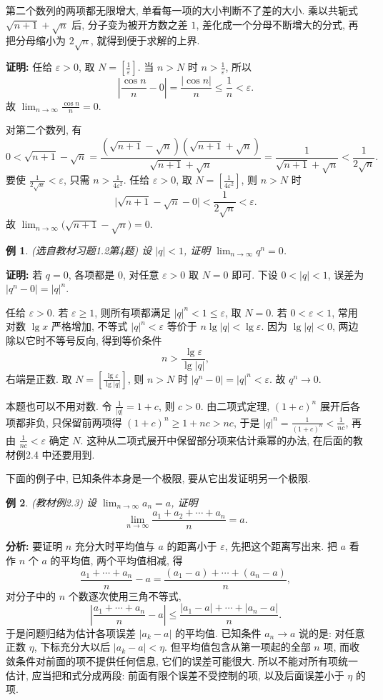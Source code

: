 \documentclass[UTF8,openany]{ctexbook}
\theoremstyle{chinesetextbook}
\newtheorem{example}{例}[section]
\newenvironment{cnproof}{\par\indent\textbf{证明:} \ignorespaces}{\par}
\begin{document}
第二个数列的两项都无限增大, 单看每一项的大小判断不了差的大小. 乘以共轭式 $\sqrt{n+1}+\sqrt n$ 后, 分子变为被开方数之差 $1$, 差化成一个分母不断增大的分式, 再把分母缩小为 $2\sqrt n$, 就得到便于求解的上界.
\begin{cnproof}
任给 $\varepsilon>0$, 取 $\displaystyle N=\left[\frac1\varepsilon\right]$. 当 $n>N$ 时 $\displaystyle n>\frac1\varepsilon$, 所以
\[
\left|\frac{\cos n}n-0\right|=\frac{|\cos n|}n\le\frac1n<\varepsilon.
\]
故 $\displaystyle\lim_{n\to\infty}\frac{\cos n}n=0$.

对第二个数列, 有
\[
0<\sqrt{n+1}-\sqrt n=\frac{(\sqrt{n+1}-\sqrt n)(\sqrt{n+1}+\sqrt n)}{\sqrt{n+1}+\sqrt n}=\frac1{\sqrt{n+1}+\sqrt n}<\frac1{2\sqrt n}.
\]
要使 $\displaystyle\frac1{2\sqrt n}<\varepsilon$, 只需 $\displaystyle n>\frac1{4\varepsilon^2}$. 任给 $\varepsilon>0$, 取 $\displaystyle N=\left[\frac1{4\varepsilon^2}\right]$, 则 $n>N$ 时
\[
\bigl|\sqrt{n+1}-\sqrt n-0\bigr|<\frac1{2\sqrt n}<\varepsilon.
\]
故 $\displaystyle\lim_{n\to\infty}\bigl(\sqrt{n+1}-\sqrt n\bigr)=0$.
\end{cnproof}
\begin{example}
\textnormal{(选自教材习题1.2第4题)} 设 $|q|<1$, 证明 $\displaystyle\lim_{n\to\infty}q^n=0$.
\end{example}
\begin{cnproof}
若 $q=0$, 各项都是 $0$, 对任意 $\varepsilon>0$ 取 $N=0$ 即可. 下设 $0<|q|<1$, 误差为 $|q^n-0|=|q|^n$.

任给 $\varepsilon>0$. 若 $\varepsilon\ge1$, 则所有项都满足 $|q|^n<1\le\varepsilon$, 取 $N=0$. 若 $0<\varepsilon<1$, 常用对数 $\lg x$ 严格增加, 不等式 $|q|^n<\varepsilon$ 等价于 $n\lg|q|<\lg\varepsilon$. 因为 $\lg|q|<0$, 两边除以它时不等号反向, 得到等价条件
\[
n>\frac{\lg\varepsilon}{\lg|q|},
\]
右端是正数. 取 $\displaystyle N=\left[\frac{\lg\varepsilon}{\lg|q|}\right]$, 则 $n>N$ 时 $|q^n-0|=|q|^n<\varepsilon$. 故 $q^n\to0$.
\end{cnproof}
本题也可以不用对数. 令 $\displaystyle\frac1{|q|}=1+c$, 则 $c>0$. 由二项式定理, $(1+c)^n$ 展开后各项都非负, 只保留前两项得 $(1+c)^n\ge1+nc>nc$, 于是 $\displaystyle|q|^n=\frac1{(1+c)^n}<\frac1{nc}$, 再由 $\displaystyle\frac1{nc}<\varepsilon$ 确定 $N$. 这种从二项式展开中保留部分项来估计乘幂的办法, 在后面的教材例2.4 中还要用到.

下面的例子中, 已知条件本身是一个极限, 要从它出发证明另一个极限.
\begin{example}
\textnormal{(教材例2.3)} 设 $\displaystyle\lim_{n\to\infty}a_n=a$, 证明
\[
\lim_{n\to\infty}\frac{a_1+a_2+\cdots+a_n}n=a.
\]
\end{example}
\par\indent\textbf{分析:} 要证明 $n$ 充分大时平均值与 $a$ 的距离小于 $\varepsilon$, 先把这个距离写出来. 把 $a$ 看作 $n$ 个 $a$ 的平均值, 两个平均值相减, 得
\[
\frac{a_1+\cdots+a_n}n-a=\frac{(a_1-a)+\cdots+(a_n-a)}n,
\]
对分子中的 $n$ 个数逐次使用三角不等式,
\[
\left|\frac{a_1+\cdots+a_n}n-a\right|\le\frac{|a_1-a|+\cdots+|a_n-a|}n.
\]
于是问题归结为估计各项误差 $|a_k-a|$ 的平均值. 已知条件 $a_n\to a$ 说的是: 对任意正数 $\eta$, 下标充分大以后 $|a_k-a|<\eta$. 但平均值包含从第一项起的全部 $n$ 项, 而收敛条件对前面的项不提供任何信息, 它们的误差可能很大. 所以不能对所有项统一估计, 应当把和式分成两段: 前面有限个误差不受控制的项, 以及后面误差小于 $\eta$ 的项.
\end{document}
